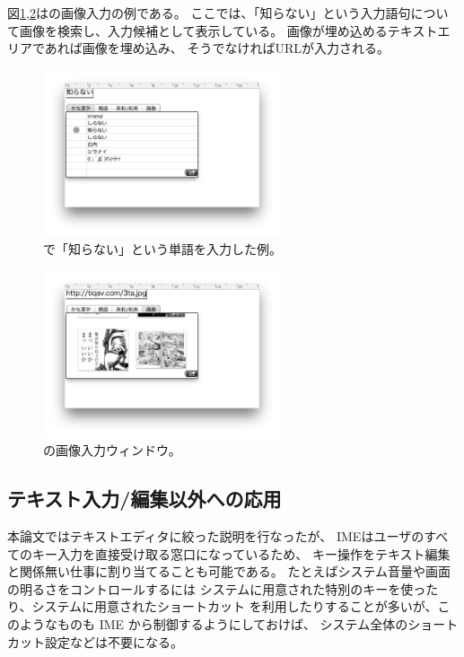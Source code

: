 図\ref{image1},\ref{image2}は{\system}の画像入力の例である。
ここでは、「知らない」という入力語句について画像を検索し、入力候補として表示している。
画像が埋め込めるテキストエリアであれば画像を埋め込み、
そうでなければURLが入力される。

\begin{figure}[H]
\centerline{\includegraphics[width=70mm,bb=0 0 600 400]{figures/image1.png}}
\caption{{\system}で「知らない」という単語を入力した例。}
\label{image1}
\end{figure}

\begin{figure}[H]
\centerline{\includegraphics[width=70mm,bb=0 0 600 400]{figures/image2.png}}
\caption{{\system}の画像入力ウィンドウ。}
\label{image2}
\end{figure}

\subsection{テキスト入力/編集以外への応用}

本論文ではテキストエディタに絞った説明を行なったが、
IMEはユーザのすべてのキー入力を直接受け取る窓口になっているため、
キー操作をテキスト編集と関係無い仕事に割り当てることも可能である。
%
たとえばシステム音量や画面の明るさをコントロールするには
システムに用意された特別のキーを使ったり、システムに用意されたショートカット
を利用したりすることが多いが、このようなものも IME から制御するようにしておけば、
システム全体のショートカット設定などは不要になる。

